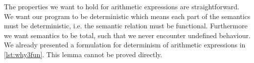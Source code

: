 The properties we want to hold for arithmetic expressions are straightforward.
We want our program to be deterministic which means each part of the semantics must be deterministic, i.e. the semantic relation must be functional.
Furthermore we want semantics to be total, such that we never encounter undefined behaviour.
We already presented a formulation for determinism of arithmetic expressions in \autoref{lst:why3fun}.
This lemma cannot be proved directly.